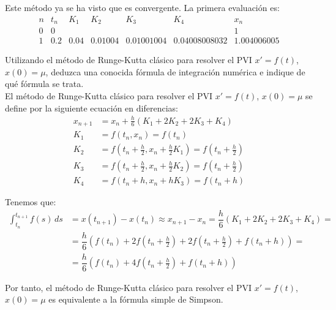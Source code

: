 \begin{ejercicio}
\begin{enumerate}
        Este método ya se ha visto que es convergente. La primera evaluación es:
        \begin{equation*}
            \begin{array}{c|c|c|c|c|c|c}
                n & t_n & K_1 & K_2 & K_3 & K_4 & x_n\\ \hline
                0 & 0 & &&&& 1 \\
                1 & 0.2 & 0.04 & 0.01004&0.01001004&0.04008008032& 1.004006005
            \end{array}
        \end{equation*}

    \end{enumerate}
\end{ejercicio}

\begin{ejercicio}\label{ej:3.1.9}
    Utilizando el método de Runge-Kutta clásico para resolver el PVI $x' = f(t)$, $x(0) = \mu$, deduzca una conocida fórmula de integración numérica e indique de qué fórmula se trata.\\

    El método de Runge-Kutta clásico para resolver el PVI $x' = f(t)$, $x(0) = \mu$ se define por la siguiente ecuación en diferencias:
    \begin{align*}
        x_{n+1} &= x_n + \frac{h}{6} \left( K_1 + 2K_2 + 2K_3 + K_4 \right)\\
        K_1 &= f(t_n, x_n) = f(t_n) \\
        K_2 &= f\left(t_n + \frac{h}{2}, x_n + \frac{h}{2} K_1\right) = f\left(t_n + \frac{h}{2}\right) \\
        K_3 &= f\left(t_n + \frac{h}{2}, x_n + \frac{h}{2} K_2\right) = f\left(t_n + \frac{h}{2}\right) \\
        K_4 &= f(t_n + h, x_n + h K_3)
        = f(t_n + h)
    \end{align*}

    Tenemos que:
    \begin{align*}
        \int_{t_n}^{t_{n+1}} f(s)\, ds &= x(t_{n+1}) - x(t_n) \approx x_{n+1} - x_n 
        = \dfrac{h}{6} \left( K_1 + 2K_2 + 2K_3 + K_4 \right)
        =\\&= \dfrac{h}{6} \left( f(t_n) + 2f\left(t_n + \frac{h}{2}\right) + 2f\left(t_n + \frac{h}{2}\right) + f(t_n + h) \right)
        =\\&= \dfrac{h}{6} \left( f(t_n) + 4f\left(t_n + \frac{h}{2}\right) + f(t_n + h) \right)
    \end{align*}

    Por tanto, el método de Runge-Kutta clásico para resolver el PVI $x' = f(t)$, $x(0) = \mu$ es equivalente a la fórmula simple de Simpson.
\end{ejercicio}

